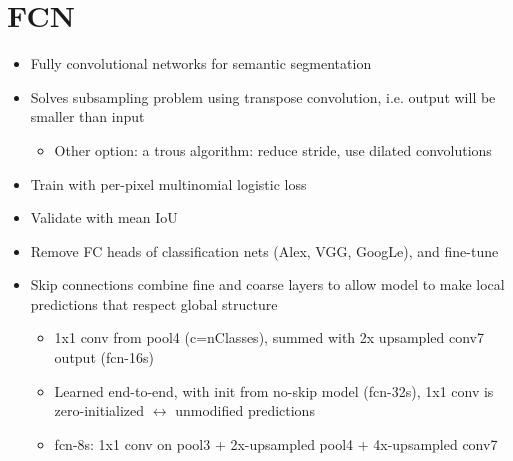 \section*{FCN \cite{fcn}}
\begin{itemize}
\item Fully convolutional networks for semantic segmentation
\item Solves subsampling problem using transpose convolution, i.e. output will be smaller than input
    \begin{itemize}
        \item Other option: a trous algorithm: reduce stride, use dilated convolutions
    \end{itemize}
\item Train with per-pixel multinomial logistic loss
\item Validate with mean IoU
\item Remove FC heads of classification nets (Alex, VGG, GoogLe), and fine-tune
\item Skip connections combine fine and coarse layers to allow model to make local predictions that respect global structure
	\begin{itemize}
	    \item 1x1 conv from pool4 (c=nClasses), summed with 2x upsampled conv7 output (fcn-16s)
	    \item Learned end-to-end, with init from no-skip model (fcn-32s), 1x1 conv is zero-initialized $\leftrightarrow$ unmodified predictions
	    \item fcn-8s: 1x1 conv on pool3 + 2x-upsampled pool4 + 4x-upsampled conv7
	\end{itemize}
\end{itemize}

